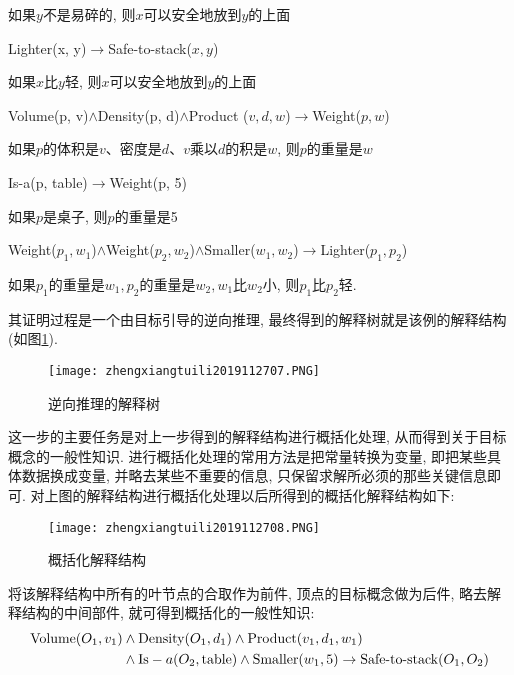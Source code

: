 如果$y$不是易碎的, 则$x$可以安全地放到$y$的上面
\begin{center}
  Lighter(x, y)$\rightarrow$Safe-to-stack($x, y$)
\end{center}

如果$x$比$y$轻, 则$x$可以安全地放到$y$的上面
\begin{center}
  Volume(p, v)$\wedge$Density(p, d)$\wedge$Product ($v, d, w$)$\rightarrow$Weight($p, w$)
\end{center}

如果$p$的体积是$v$、密度是$d$、$v$乘以$d$的积是$w$, 则$p$的重量是$w$
\begin{center}
  Is-a(p, table)$\rightarrow$Weight(p, 5)
\end{center}

如果$p$是桌子, 则$p$的重量是5
\begin{center}
  Weight($p_1, w_1$)$\wedge$Weight($p_2,w_2$)$\wedge$Smaller($w_1, w_2$)$\rightarrow$Lighter($p_1, p_2$)
\end{center}

如果$p_1$的重量是$w_1, p_2$的重量是$w_2,w_1$比$w_2$小,  则$p_1$比$p_2$轻.

其证明过程是一个由目标引导的逆向推理, 最终得到的解释树就是该例的解释结构(如图\ref{AI32fig2707}).
\begin{figure}[H]
\centering
\texttt{[image: zhengxiangtuili2019112707.PNG]}
\caption{逆向推理的解释树}
\label{AI32fig2707}
\end{figure}

这一步的主要任务是对上一步得到的解释结构进行概括化处理, 从而得到关于目标概念的一般性知识.
     进行概括化处理的常用方法是把常量转换为变量, 即把某些具体数据换成变量, 并略去某些不重要的信息, 只保留求解所必须的那些关键信息即可.
     对上图的解释结构进行概括化处理以后所得到的概括化解释结构如下:
\begin{figure}[H]
\centering
\texttt{[image: zhengxiangtuili2019112708.PNG]}
\caption{概括化解释结构}
\label{AI32fig2708}
\end{figure}
 将该解释结构中所有的叶节点的合取作为前件, 顶点的目标概念做为后件, 略去解释结构的中间部件, 就可得到概括化的一般性知识:
\begin{align}
  \textup{Volume}(O_1,v_1)&\wedge \textup{Density}(O_1,d_1)\wedge \textup{Product}(v_1,d_1,w_1)\notag\\
                          &\wedge \textup{Is}-a(O_2,\textup{table})\wedge\textup{Smaller}(w_1,5)\rightarrow \textup{Safe-to-stack}(O_1,O_2)
\end{align}
